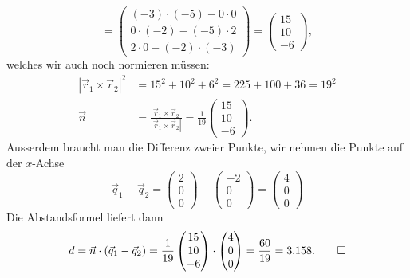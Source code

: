 \begin{loesung}
\[=
\begin{pmatrix}
(-3)\cdot (-5) - 0 \cdot 0 \\
0\cdot (-2) - (-5) \cdot 2\\ 
2\cdot 0 - (-2) \cdot (-3)
\end{pmatrix}
=
\begin{pmatrix}
15\\10\\ -6
\end{pmatrix},
\]
welches wir auch noch normieren müssen:
\begin{align*}
|\vec r_1\times\vec r_2|^2
&=15^2+10^2+6^2=225+100+36=19^2
\\
\vec n&=
\frac{\vec r_1\times\vec r_2}{|\vec r_1\times\vec r_2|}=
\frac1{19}
\begin{pmatrix}
15\\10\\ -6
\end{pmatrix}.
\end{align*}
Ausserdem braucht man die Differenz zweier Punkte,
wir nehmen die Punkte auf der $x$-Achse
\[
\vec q_1-\vec q_2
=
\begin{pmatrix}2\\0\\0\end{pmatrix}
-
\begin{pmatrix}-2\\0\\0\end{pmatrix}
=
\begin{pmatrix}4\\0\\0\end{pmatrix}
\]
Die Abstandsformel liefert dann
\[
d=\vec n\cdot (\vec q_1-\vec q_2)=
\frac1{19}
\begin{pmatrix}
15\\10\\ -6
\end{pmatrix}
\cdot
\begin{pmatrix}4\\0\\0\end{pmatrix}
=\frac{60}{19}
=
3.158.
\qedhere
\]
\end{loesung}


